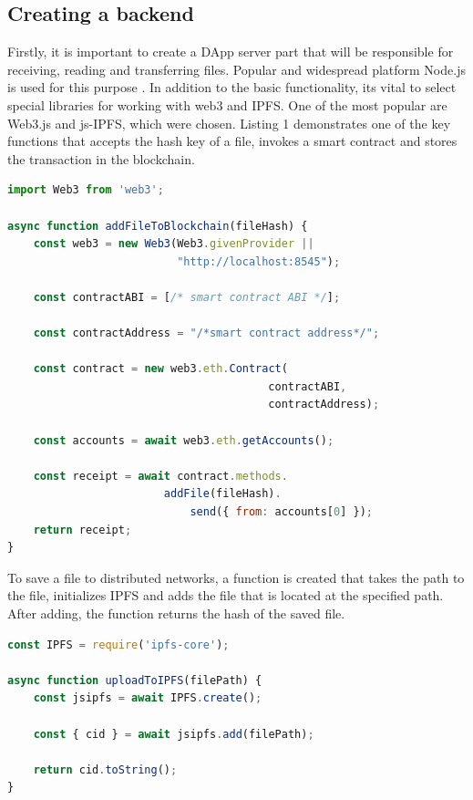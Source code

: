 \documentclass[10pt,conference,a4paper]{IEEEtran_EDM}
\begin{document}
\subsection{Creating a backend}
Firstly, it is important to create a DApp server part that will be responsible for receiving, reading and transferring files.
Popular and widespread platform Node.js is used for this purpose \cite{Herron}.
In addition to the basic functionality, its vital to select special libraries for working with web3 and IPFS.
One of the most popular are Web3.js and js-IPFS, which were chosen.
Listing 1 demonstrates one of the key functions that accepts the hash key of a file, invokes a smart contract and stores the transaction in the blockchain.


\begin{lstlisting}[language=JavaScript, caption=JavaScript code implementing saving to the blockchain]
import Web3 from 'web3';

async function addFileToBlockchain(fileHash) {
    const web3 = new Web3(Web3.givenProvider ||
                          "http://localhost:8545");

    const contractABI = [/* smart contract ABI */];

    const contractAddress = "/*smart contract address*/";

    const contract = new web3.eth.Contract(
                                        contractABI,
                                        contractAddress);

    const accounts = await web3.eth.getAccounts();

    const receipt = await contract.methods.
                        addFile(fileHash).
                            send({ from: accounts[0] });
    return receipt;
}
\end{lstlisting}

To save a file to distributed networks, a function is created that takes the path to the file, initializes IPFS and adds the file that is located at the specified path.
After adding, the function returns the hash of the saved file.

\begin{lstlisting}[language=JavaScript, caption= Saving a file to IPFS]
const IPFS = require('ipfs-core');

async function uploadToIPFS(filePath) {
    const jsipfs = await IPFS.create();

    const { cid } = await jsipfs.add(filePath);

    return cid.toString();
}
\end{lstlisting}
\end{document}
